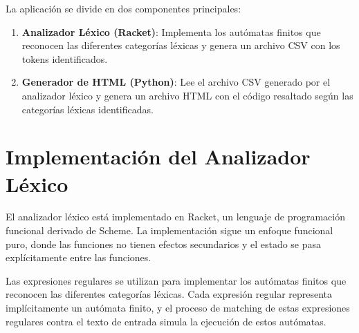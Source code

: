 \documentclass[12pt,letterpaper]{report}
\begin{document}
La aplicación se divide en dos componentes principales:

\begin{enumerate}
    \item \textbf{Analizador Léxico (Racket)}: Implementa los autómatas finitos que reconocen las diferentes categorías léxicas y genera un archivo CSV con los tokens identificados.
    \item \textbf{Generador de HTML (Python)}: Lee el archivo CSV generado por el analizador léxico y genera un archivo HTML con el código resaltado según las categorías léxicas identificadas.
\end{enumerate}

\section{Implementación del Analizador Léxico}

El analizador léxico está implementado en Racket, un lenguaje de programación funcional derivado de Scheme. La implementación sigue un enfoque funcional puro, donde las funciones no tienen efectos secundarios y el estado se pasa explícitamente entre las funciones.

Las expresiones regulares se utilizan para implementar los autómatas finitos que reconocen las diferentes categorías léxicas. Cada expresión regular representa implícitamente un autómata finito, y el proceso de matching de estas expresiones regulares contra el texto de entrada simula la ejecución de estos autómatas.
\end{document}
